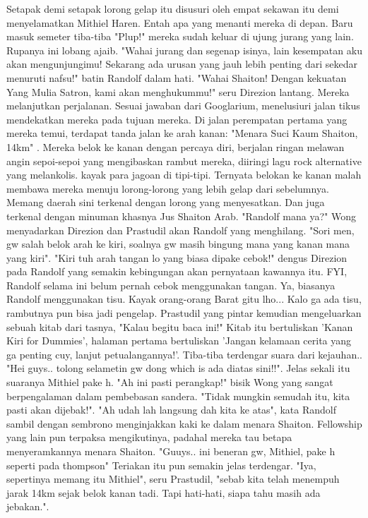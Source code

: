 \documentclass[a4paper,11pt,final]{article}
\begin{document}
Setapak demi setapak lorong gelap itu disusuri oleh empat sekawan itu demi menyelamatkan Mithiel Haren. Entah apa yang menanti mereka di depan.
Baru masuk semeter tiba-tiba "Plup!" mereka sudah keluar di ujung jurang yang lain. Rupanya ini lobang ajaib.
"Wahai jurang dan segenap isinya, lain kesempatan aku akan mengunjungimu! Sekarang ada urusan yang jauh lebih penting dari sekedar menuruti nafsu!" batin Randolf dalam hati.
"Wahai Shaiton! Dengan kekuatan Yang Mulia Satron, kami akan menghukummu!" seru Direzion lantang. Mereka melanjutkan perjalanan.
Sesuai jawaban dari Googlarium, menelusiuri jalan tikus mendekatkan mereka pada tujuan mereka. Di jalan perempatan pertama yang mereka temui, terdapat tanda jalan ke arah kanan: "Menara Suci Kaum Shaiton, 14km" .
Mereka belok ke kanan dengan percaya diri, berjalan ringan melawan angin sepoi-sepoi yang mengibaskan rambut mereka, diiringi lagu rock alternative yang melankolis. kayak para jagoan di tipi-tipi.
Ternyata belokan ke kanan malah membawa mereka menuju lorong-lorong yang lebih gelap dari sebelumnya. Memang daerah sini terkenal dengan lorong yang menyesatkan. Dan juga terkenal dengan minuman khasnya Jus Shaiton Arab.
"Randolf mana ya?" Wong menyadarkan Direzion dan Prastudil akan Randolf yang menghilang. "Sori men, gw salah belok arah ke kiri, soalnya gw masih bingung mana yang kanan mana yang kiri".
"Kiri tuh arah tangan lo yang biasa dipake cebok!" dengus Direzion pada Randolf yang semakin kebingungan akan pernyataan kawannya itu. FYI, Randolf selama ini belum pernah cebok menggunakan tangan.
Ya, biasanya Randolf menggunakan tisu. Kayak orang-orang Barat gitu lho...
Kalo ga ada tisu, rambutnya pun bisa jadi pengelap.
Prastudil yang pintar kemudian mengeluarkan sebuah kitab dari tasnya, "Kalau begitu baca ini!" Kitab itu bertuliskan 'Kanan Kiri for Dummies', halaman pertama bertuliskan 'Jangan kelamaan cerita yang ga penting cuy, lanjut petualangannya!'.
Tiba-tiba terdengar suara dari kejauhan.. "Hei guys.. tolong selametin gw dong which is ada diatas sini!!". Jelas sekali itu suaranya Mithiel pake h.
"Ah ini pasti perangkap!" bisik Wong yang sangat berpengalaman dalam pembebasan sandera. "Tidak mungkin semudah itu, kita pasti akan dijebak!".
"Ah udah lah langsung dah kita ke atas", kata Randolf sambil dengan sembrono menginjakkan kaki ke dalam menara Shaiton. Fellowship yang lain pun terpaksa mengikutinya, padahal mereka tau betapa menyeramkannya menara Shaiton.
"Guuys.. ini beneran gw, Mithiel, pake h seperti pada thompson" Teriakan itu pun semakin jelas terdengar.
"Iya, sepertinya memang itu Mithiel", seru Prastudil, "sebab kita telah menempuh jarak 14km sejak belok kanan tadi. Tapi hati-hati, siapa tahu masih ada jebakan.".
\end{document}

